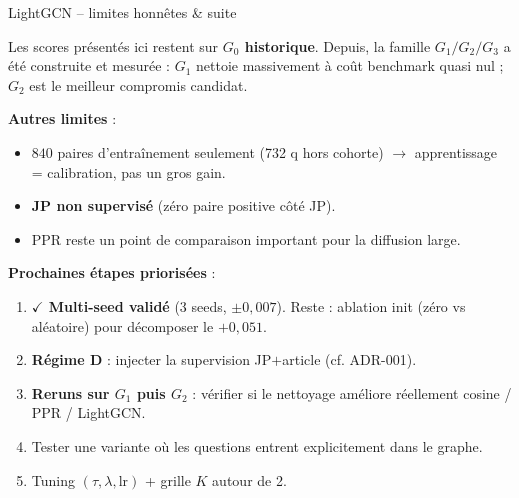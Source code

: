 \documentclass[aspectratio=169,10pt]{beamer}
\newcommand{\warnbox}[1]{%
  \begin{center}
  \colorbox{red!10}{\parbox{0.92\linewidth}{\centering #1}}
  \end{center}}
\begin{document}
\begin{frame}{LightGCN -- limites honnêtes \& suite}
  \footnotesize
  \warnbox{\scriptsize Les scores présentés ici restent sur \textbf{$G_0$ historique}.
  Depuis, la famille \textbf{$G_1/G_2/G_3$} a été construite et mesurée :
  $G_1$ nettoie massivement à coût benchmark quasi nul ; $G_2$ est le meilleur compromis candidat.}

  \vspace{0.4em}
  \textbf{Autres limites} :
  \begin{itemize}\setlength{\itemsep}{0.05em}
    \item $840$ paires d'entraînement seulement (732 q hors cohorte) $\to$ apprentissage = calibration, pas un gros gain.
    \item \textbf{JP non supervisé} (zéro paire positive côté JP).
    \item PPR reste un point de comparaison important pour la diffusion large.
  \end{itemize}

  \vspace{0.4em}
  \textbf{Prochaines étapes priorisées} :
  \begin{enumerate}\setlength{\itemsep}{0.1em}
    \item \textcolor{ok}{\textbf{$\checkmark$ Multi-seed validé}} (3 seeds, $\pm 0{,}007$). Reste : ablation init (zéro vs aléatoire) pour décomposer le $+0{,}051$.
    \item \textbf{Régime D} : injecter la supervision JP$+$article (cf. ADR-001).
    \item \textbf{Reruns sur $G_1$ puis $G_2$} : vérifier si le nettoyage améliore réellement cosine / PPR / LightGCN.
    \item Tester une variante où les questions entrent explicitement dans le graphe.
    \item Tuning $(\tau, \lambda, \mathrm{lr})$ + grille $K$ autour de 2.
  \end{enumerate}
\end{frame}
\end{document}
